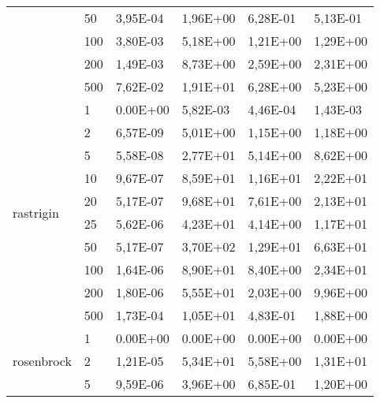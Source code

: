 \begin{longtable}[c]{|p{3.5cm}|l|l|l|l|l|}
                                        & 50        & 3,95E-04   & 1,96E+00   & 6,28E-01   & 5,13E-01  \\ \cline{2-6} 
                                        & 100       & 3,80E-03   & 5,18E+00   & 1,21E+00   & 1,29E+00  \\ \cline{2-6} 
                                        & 200       & 1,49E-03   & 8,73E+00   & 2,59E+00   & 2,31E+00  \\ \cline{2-6} 
                                        & 500       & 7,62E-02   & 1,91E+01   & 6,28E+00   & 5,23E+00  \\ \hline
\multirow[t]{10}{*}{rastrigin}             & 1         & 0.00E+00   & 5,82E-03   & 4,46E-04   & 1,43E-03  \\ \cline{2-6} 
                                        & 2         & 6,57E-09   & 5,01E+00   & 1,15E+00   & 1,18E+00  \\ \cline{2-6} 
                                        & 5         & 5,58E-08   & 2,77E+01   & 5,14E+00   & 8,62E+00  \\ \cline{2-6} 
                                        & 10        & 9,67E-07   & 8,59E+01   & 1,16E+01   & 2,22E+01  \\ \cline{2-6} 
                                        & 20        & 5,17E-07   & 9,68E+01   & 7,61E+00   & 2,13E+01  \\ \cline{2-6} 
                                        & 25        & 5,62E-06   & 4,23E+01   & 4,14E+00   & 1,17E+01  \\ \cline{2-6} 
                                        & 50        & 5,17E-07   & 3,70E+02   & 1,29E+01   & 6,63E+01  \\ \cline{2-6} 
                                        & 100       & 1,64E-06   & 8,90E+01   & 8,40E+00   & 2,34E+01  \\ \cline{2-6} 
                                        & 200       & 1,80E-06   & 5,55E+01   & 2,03E+00   & 9,96E+00  \\ \cline{2-6} 
                                        & 500       & 1,73E-04   & 1,05E+01   & 4,83E-01   & 1,88E+00  \\ \hline
\multirow[t]{10}{*}{rosenbrock}            & 1         & 0.00E+00   & 0.00E+00   & 0.00E+00   & 0.00E+00  \\ \cline{2-6} 
                                        & 2         & 1,21E-05   & 5,34E+01   & 5,58E+00   & 1,31E+01  \\ \cline{2-6} 
                                        & 5         & 9,59E-06   & 3,96E+00   & 6,85E-01   & 1,20E+00  \\ \cline{2-6} 

\end{longtable}
